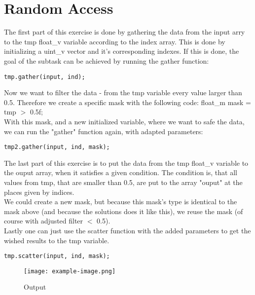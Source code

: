 \documentclass{article}
\begin{document}
\section{Random Access}
The first part of this exercise is done by gathering the data from the input
arry to the tmp float\_v variable according to the index array. This is done
by initializing a uint\_v vector and it's corresponding indexes. If this is
done, the goal of the subtask can be achieved by running the gather function:\\
\begin{lstlisting}[caption=gathering data]
    tmp.gather(input, ind);
\end{lstlisting}
Now we want to filter the data - from the tmp variable every value larger than
0.5. Therefore we create a specific mask with the following code:
float\_m mask = tmp $>$ 0.5f;\\
With this mask, and a new initialized variable, where we want to safe the data,
we can run the "gather" function again, with adapted parameters:\\
\begin{lstlisting}[caption=gathering filtered data]
    tmp2.gather(input, ind, mask);
\end{lstlisting}
The last part of this exercise is to put the data from the tmp float\_v variable
to the ouput array, when it satisfies a given condition.
The condition is, that all values from tmp, that are smaller than 0.5, are 
put to the array "ouput" at the places given by indices.\\
We could create a new mask, but because this mask's type is identical to
the mask above (and because the solutions does it like this), we reuse the mask
(of course with adjusted filter $<$ 0.5).\\
Lastly one can just use the scatter function with the added parameters to get the
wished results to the tmp variable.
\begin{lstlisting}[caption=scattering]
    tmp.scatter(input, ind, mask);
\end{lstlisting}


\begin{figure}[H]
    \centering
    \texttt{[image: example-image.png]} 
    \caption{Output}
    \label{fig:example}
\end{figure}
\end{document}
